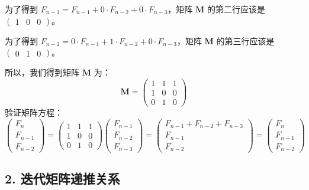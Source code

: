 \documentclass{article}
\begin{document}
为了得到 $F_{n-1} = F_{n-1} + 0 \cdot F_{n-2} + 0 \cdot F_{n-3}$，矩阵 $\mathbf{M}$ 的第二行应该是 $\begin{pmatrix} 1 & 0 & 0 \end{pmatrix}$。

为了得到 $F_{n-2} = 0 \cdot F_{n-1} + 1 \cdot F_{n-2} + 0 \cdot F_{n-3}$，矩阵 $\mathbf{M}$ 的第三行应该是 $\begin{pmatrix} 0 & 1 & 0 \end{pmatrix}$。

所以，我们得到矩阵 $\mathbf{M}$ 为：
$$ \mathbf{M} = \begin{pmatrix} 1 & 1 & 1 \\ 1 & 0 & 0 \\ 0 & 1 & 0 \end{pmatrix} $$
验证矩阵方程：
$$ \begin{pmatrix} F_n \\ F_{n-1} \\ F_{n-2} \end{pmatrix} = \begin{pmatrix} 1 & 1 & 1 \\ 1 & 0 & 0 \\ 0 & 1 & 0 \end{pmatrix} \begin{pmatrix} F_{n-1} \\ F_{n-2} \\ F_{n-3} \end{pmatrix} = \begin{pmatrix} F_{n-1} + F_{n-2} + F_{n-3} \\ F_{n-1} \\ F_{n-2} \end{pmatrix} = \begin{pmatrix} F_n \\ F_{n-1} \\ F_{n-2} \end{pmatrix} $$

\subsection*{2. 迭代矩阵递推关系}
\end{document}
